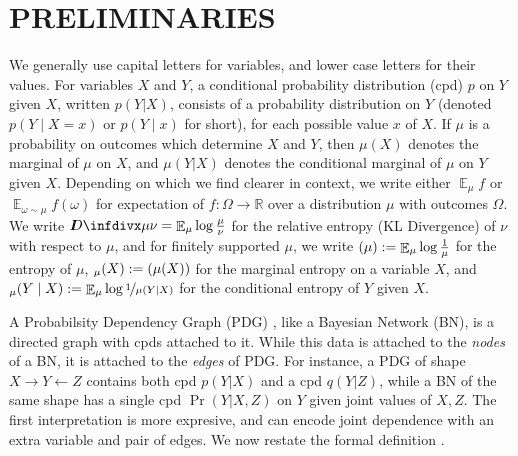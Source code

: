 \documentclass[twoside]{article}
\theoremstyle{plain}
\theoremstyle{definition}
\let\H\relax
\DeclareMathOperator{\H}{\mathrm{H}} %
\DeclareMathOperator*{\Ex}{\mathbb{E}} %
\newcommand{\thickD}{I\mkern-8muD}
\newcommand{\kldiv}{\thickD\infdivx}
\newcommand{\ed}[3]{%
		\mathchoice%
		{#2\overset{\smash{\mskip-5mu\raisebox{-3pt}{${#1}$}}}{\xrightarrow{\hphantom{\scriptstyle {#1}}}} #3} %
		{#2\overset{\smash{\mskip-5mu\raisebox{-3pt}{$\scriptstyle {#1}$}}}{\xrightarrow{\hphantom{\scriptstyle {#1}}}} #3}%
		{#2\overset{\smash{\mskip-5mu\raisebox{-3pt}{$\scriptscriptstyle {#1}$}}}{\xrightarrow{\hphantom{\scriptscriptstyle {#1}}}} #3} %
		{#2\overset{\smash{\mskip-5mu\raisebox{-3pt}{$\scriptscriptstyle {#1}$}}}{\xrightarrow{\hphantom{\scriptscriptstyle {#1}}}} #3}} %
\begin{document}
\section{PRELIMINARIES}
We generally use capital letters for variables, and lower case letters for their values.
For variables $X$ and $Y$, a conditional probability distribution (cpd) $p$ on $Y$ given $X$, written $p(Y|X)$, consists of a probability distribution on $Y$ (denoted $p(Y\mid X\!=\!x)$ or $p(Y\mid x)$ for short), for each possible value $x$ of $X$.
If $\mu$ is a probability on outcomes which determine $X$ and $Y$, then $\mu(X)$ denotes the marginal of $\mu$ on $X$, and $\mu(Y|X)$ denotes the conditional marginal of $\mu$ on  $Y$ given $X$.
Depending on which we find clearer in context, we write either $\Ex_\mu f$ or $\Ex_{\omega \sim \mu} f(\omega)$ for expectation of $f : \Omega \to \mathbb R$ over a distribution $\mu$ with outcomes $\Omega$.
We write $\kldiv\mu\nu = \Ex_\mu \log \frac{\mu}{\nu}$ for the relative entropy (KL Divergence) of $\nu$ with respect to $\mu$, and for finitely supported $\mu$, we write $\H(\mu) := \Ex_\mu \log\frac1\mu$ for the entropy of $\mu$, $\H_\mu(X):= \H(\mu(X))$ for the marginal entropy on a variable $X$, and $\H_\mu(Y \mid X):= \Ex_\mu \log \nicefrac1{\mu(Y|X)}$ for the conditional entropy of $Y$ given $X$.

A Probabilsity Dependency Graph (PDG) \cite{richardson2020probabilistic}, like a Bayesian Network (BN), is a directed graph with cpds attached to it. While this data is attached to the \emph{nodes} of a BN, it is attached to the \emph{edges} of PDG.
For instance, a PDG of shape $X \to Y \leftarrow Z$ contains both cpd $p(Y | X)$ and a cpd $q(Y | Z)$, while a BN of the same shape has a single cpd $\Pr(Y | X,Z)$ on $Y$ given joint values of $X,Z$.
The first interpretation is more expresive, and can encode joint dependence with an extra variable and pair of edges.
We now restate the formal definition .
\end{document}
